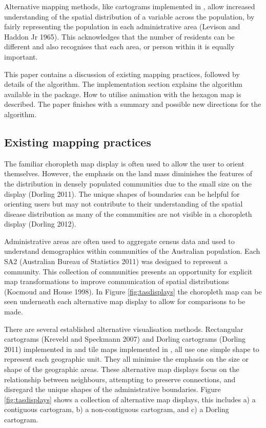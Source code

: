 Alternative mapping methods, like cartograms implemented in , allow increased understanding of the spatial distribution of a variable across the population, by fairly representing the population in each administrative area (Levison and Haddon Jr 1965). This acknowledges that the number of residents can be different and also recognises that each area, or person within it is equally important.

This paper contains a discussion of existing mapping practices, followed by details of the algorithm. The implementation section explains the algorithm available in the  package. How to utilise animation with the hexagon map is described. The paper finishes with a summary and possible new directions for the algorithm.

\hypertarget{existing-mapping-practices}{%
\subsection{Existing mapping practices}\label{existing-mapping-practices}}

The familiar choropleth map display is often used to allow the user to orient themselves. However, the emphasis on the land mass diminishes the features of the distribution in densely populated communities due to the small size on the display (Dorling 2011). The unique shapes of boundaries can be helpful for orienting users but may not contribute to their understanding of the spatial disease distribution as many of the communities are not visible in a choropleth display (Dorling 2012).

Administrative areas are often used to aggregate census data and used to understand demographics within communities of the Australian population. Each SA2 (Australian Bureau of Statistics 2011) was designed to represent a community. This collection of communities presents an opportunity for explicit map transformations to improve communication of spatial distributions (Kocmoud and House 1998). In Figure \ref{fig:tasdisplays} the choropleth map can be seen underneath each alternative map display to allow for comparisons to be made.

There are several established alternative visualisation methods. Rectangular cartograms (Kreveld and Speckmann 2007) and Dorling cartograms (Dorling 2011) implemented in  and tile maps implemented in , all use one simple shape to represent each geographic unit. They all minimise the emphasis on the size or shape of the geographic areas. These alternative map displays focus on the relationship between neighbours, attempting to preserve connections, and disregard the unique shapes of the administrative boundaries. Figure \ref{fig:tasdisplays} shows a collection of alternative map displays, this includes a) a contiguous cartogram, b) a non-contiguous cartogram, and c) a Dorling cartogram.

